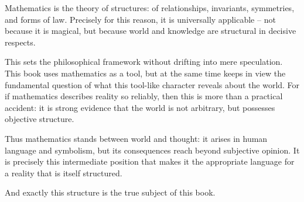 \begin{NoteBox}
	\label{box:working-definition}
	\small
	Mathematics is the theory of structures:
	of relationships,
	invariants,
	symmetries,
	and forms of law.
	Precisely for this reason, it is universally applicable --
	not because it is magical,
	but because world and knowledge
	are structural in decisive respects.
\end{NoteBox}

This sets the philosophical framework
without drifting into mere speculation.
This book uses mathematics as a tool,
but at the same time keeps in view the fundamental question
of what this tool-like character reveals about the world.
For if mathematics describes reality so reliably,
then this is more than a practical accident:
it is strong evidence
that the world is not arbitrary,
but possesses objective structure.

Thus mathematics stands between world and thought:
it arises in human language and symbolism,
but its consequences reach beyond subjective opinion.
It is precisely this intermediate position
that makes it the appropriate language
for a reality
that is itself structured.

And exactly this structure is the true subject of this book.
